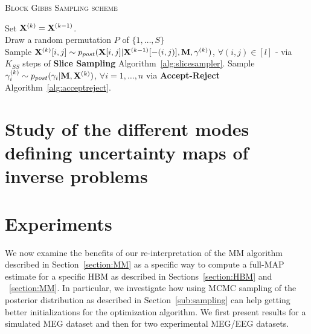 {\fontsize{4}{4}\selectfont
\begin{algorithm}[t]
\caption{\textsc{Block Gibbs Sampling scheme}}

    {%
    Set $\mathbf{X}^{(k)} = \mathbf{X}^{(k-1)}$.\\
    		{
    		Draw a random permutation $P$ of $\{1,\ldots,S\}$\\
    			{
			Sample $\mathbf{X}^{(k)}[i,j] \sim p_{post}(\mathbf{X}[i,j]|\mathbf{X}^{(k-1)}[-(i,j)],\mathbf{M},\mathbf{\gamma}^{(k)})$, $\forall (i,j)\in [l]$ - via $K_{SS}$ steps of \textbf{Slice Sampling} Algorithm~\ref{alg:slicesampler}.
			}
		}
	{Sample $\gamma^{(k)}_{i} \sim p_{post}(\gamma_{i}|\mathbf{M},\mathbf{X}^{(k)})$, $\forall i =1,\ldots,n$ via \textbf{Accept-Reject} Algorithm~\ref{alg:acceptreject}.}

    }
\label{alg:sampling}
\end{algorithm}
}

\section{Study of the different modes defining uncertainty maps of inverse problems}

\section{Experiments}
We now examine the benefits of our re-interpretation of the MM algorithm described in Section~\ref{section:MM} as a specific way to compute a full-MAP estimate for a specific HBM as described in Sections~\ref{section:HBM} and ~\ref{section:MM}.
In particular, we investigate how using MCMC sampling of the posterior distribution as described in Section~\ref{sub:sampling} can help getting better initializations for the optimization algorithm.
We first present results for a simulated MEG dataset and then for two experimental MEG/EEG datasets.

